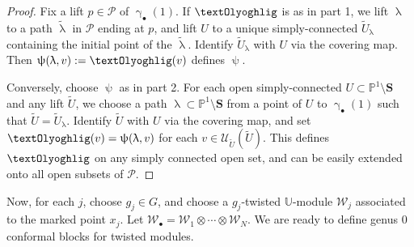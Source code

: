 \documentclass[12pt,a4paper,notitlepage]{article}
\theoremstyle{definition}
\theoremstyle{plain}
\newcommand{\mc}{\mathcal}
\newcommand{\wtd}{\widetilde}
\newcommand{\scr}{\mathscr}
\newcommand{\blt}{\bullet}
\newcommand{\Ubb}{\mathbb U}
\newcommand{\Pbb}{\mathbb P}
\newcommand{\Sbf}{\mathbf{S}}
\numberwithin{equation}{subsection}
\begin{document}
\begin{proof}
Fix a lift $p\in\mc P$ of $\upgamma_\blt(1)$. If $\text{\textOlyoghlig}$ is as in part 1, we lift $\uplambda$ to a path $\wtd\uplambda$ in $\mc P$ ending at $p$, and lift $U$ to a unique simply-connected $\wtd U_\uplambda$ containing the initial point of the $\wtd\uplambda$. Identify $\wtd U_\uplambda$ with $U$ via the covering map. Then $\uppsi(\uplambda,v):=\text{\textOlyoghlig}(v)$ defines $\uppsi$.

Conversely, choose $\uppsi$ as in part 2. For each open simply-connected $U\subset\Pbb^1\setminus\Sbf$ and any lift $\wtd U$, we choose a path $\uplambda\subset\Pbb^1\setminus\Sbf$ from a point of $U$ to $\upgamma_\blt(1)$ such that $\wtd U=\wtd U_\uplambda$.  Identify $\wtd U$ with $U$ via the covering map, and set $\text{\textOlyoghlig}(v)=\uppsi(\uplambda,v)$ for each $v\in\scr U_{\wtd U}(\wtd U)$. This defines $\text{\textOlyoghlig}$ on any simply connected open set, and can be easily extended onto all open subsets of $\mc P$.
\end{proof}




Now, for each $j$, choose $g_j\in G$, and choose a $g_j$-twisted $\Ubb$-module $\mc W_j$ associated to the marked point $x_j$.  Let $\mc W_\blt=\mc W_1\otimes\cdots\otimes\mc W_N$. We are ready to define genus $0$ conformal blocks for twisted modules. 
\end{document}
